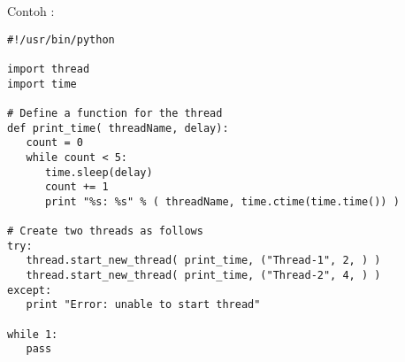 \documentclass [12pt,a4paper,notitlepage,oneside,bahasa]{article}
\begin{document}


\newpage

\vspace{12pt}
\vspace{12pt}
\noindent 
Contoh : 
\begin{verbatim}
#!/usr/bin/python

import thread
import time

# Define a function for the thread
def print_time( threadName, delay):
   count = 0
   while count < 5:
      time.sleep(delay)
      count += 1
      print "%s: %s" % ( threadName, time.ctime(time.time()) )

# Create two threads as follows
try:
   thread.start_new_thread( print_time, ("Thread-1", 2, ) )
   thread.start_new_thread( print_time, ("Thread-2", 4, ) )
except:
   print "Error: unable to start thread"

while 1:
   pass
\end{verbatim}
	
	
	
	\newpage
	
\end{document}
